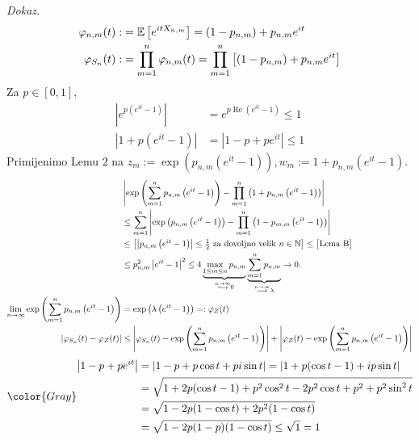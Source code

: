 \documentclass{article}
\begin{document}
\textit{Dokaz.} \[\begin{aligned}\varphi_{n,m}(t):&=\Bbb E\left[e^{itX_{n,m}}\right]=(1-p_{n,m})+p_{n,m}e^{it}\\\varphi_{S_n}(t):&=\prod_{m=1}^n\varphi_{n,m}(t)=\prod_{m=1}^n\left[(1-p_{n,m})+p_{n,m}e^{it}\right]\end{aligned}\] Za \(p\in[0,1],\) \[\begin{aligned}\left|e^{p\left(e^{it}-1\right)}\right|&=e^{p\operatorname{Re}(e^{it}-1)}\le1\\\left|1+p(e^{it}-1)\right|&=\left|1-p+pe^{it}\right|\le1\end{aligned}\] Primijenimo Lemu \(2\) na \(z_m:=\exp\left(p_{n,m}\left(e^{it}-1\right)\right),w_m:=1+p_{n,m}\left(e^{it}-1\right).\) \[\begin{aligned}{}&\left|\exp\left(\sum_{m=1}^np_{n,m}\left(e^{it}-1\right)\right)-\prod_{m=1}^n\left(1+p_{n,m}\left(e^{it}-1\right)\right)\right|\\&\le\sum_{m=1}^n\left|\exp\left(p_{n,m}\left(e^{it}-1\right)\right)-\prod_{m=1}^n\left(1-p_{m,m}\left(e^{it}-1\right)\right)\right|\\&\le\begin{bmatrix}\left|p_{n,m}\left(e^{it}-1\right)\right|\le\frac12\text{ za dovoljno velik }n\in\Bbb N\end{bmatrix}\le\begin{bmatrix}\text{Lema B}\end{bmatrix}\\&\le p_{n,m}^2\left|e^{it}-1\right|^2\le 4\underbrace{\max_{1\le m\le n}p_{n,m}}_{\overset{n\to\infty}{\longrightarrow}0}\underbrace{\sum_{m=1}^np_{n,m}}_{\overset{n\to\infty}{\longrightarrow}\lambda}\to0.\\\lim_{n\to\infty}\exp\left(\sum_{m=1}^np_{n,m}\left(e^{it}-1\right)\right)&=\exp\left(\lambda\left(e^{it}-1\right)\right)=:\varphi_Z(t)\\\left|\varphi_{S_n}(t)-\varphi_Z(t)\right|&\le\left|\varphi_{S_n}(t)-\exp\left(\sum_{m=1}^np_{n,m}\left(e^{it}-1\right)\right)\right|+\left|\varphi_Z(t)-\exp\left(\sum_{m=1}^np_{n,m}\left(e^{it}-1\right)\right)\right|\end{aligned}\]
\[\color{Gray}\begin{aligned}\left|1-p+pe^{it}\right|&=\left|1-p+p\cos t+pi\sin t\right|=|1+p(\cos t-1)+ip\sin t|\\&=\sqrt{1+2p(\cos t-1)+p^2\cos^2t-2p^2\cos t+p^2+p^2\sin^2t}\\&=\sqrt{1-2p(1-\cos t)+2p^2(1-\cos t)}\\&=\sqrt{1-2p(1-p)(1-\cos t)}\le\sqrt 1=1\end{aligned}\]
\newpage
\end{document}
